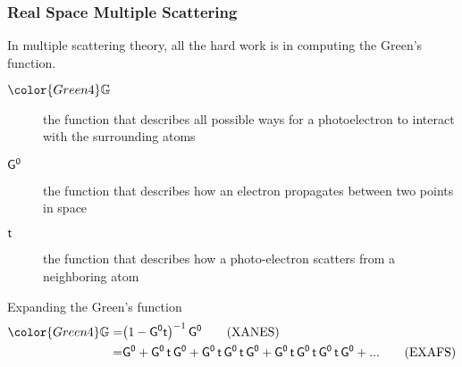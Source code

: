 \begin{frame}
  \frametitle{Real Space Multiple Scattering}

  In multiple scattering theory, all the hard work is in computing
  the Green's function.

  \begin{description}
  \item[${\color{Green4}\GMS}$] the function that describes all
    possible ways for a photoelectron to interact with the
    surrounding atoms
  \item[$\mathsf{G^0}$] the function that describes how an electron
    propagates between two points in space
  \item[$\mathsf{t}$] the function that describes how a photo-electron
    scatters from a neighboring atom
  \end{description}

  \begin{block}{Expanding the Green's function}
    ~\\[-6ex]
    \begin{align}
      {\color{Green4}\GMS} =& \big(1 - \Gnot \tmat\big)^{-1} \, \Gnot \tag{XANES}\\
      =& \Gnot + \Gnot\,\tmat\,\Gnot +
      \Gnot\,\tmat\,\Gnot\,\tmat\,\Gnot +
      \Gnot\,\tmat\,\Gnot\,\tmat\,\Gnot\,\tmat\,\Gnot + ... \tag{EXAFS}
    \end{align}
  \end{block}
\end{frame}


